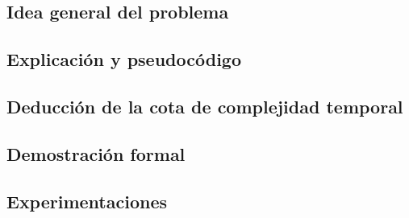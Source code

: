 \subsection{Idea general del problema}

\subsection{Explicación y pseudocódigo}



\subsection{Deducción de la cota de complejidad temporal}

\subsection{Demostración formal}
\subsection{Experimentaciones}